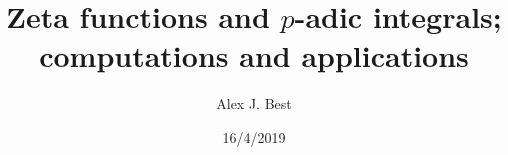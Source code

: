 
\beamertemplatenavigationsymbolsempty

\usepackage{amsmath, amssymb, amsfonts, tikz}
\usepackage[utf8]{inputenc}
\usepackage[T1]{fontenc}
\usepackage[english]{babel}
\usepackage{tabularx}
\usepackage{mathtools}
\usepackage{xmpmulti}


\usepackage{amsthm}
\theoremstyle{plain}
\newtheorem{theorem}{Theorem}[section]
\newtheorem{corollary}[theorem]{Corollary}
\newtheorem{lemma}[theorem]{Lemma}
\newtheorem{algorithm}[theorem]{Algorithm}
\newtheorem{proposition}[theorem]{Proposition}
\newtheorem{claim}[theorem]{Claim}
\newtheorem{fact}[theorem]{Fact}
\newtheorem{conjecture}[theorem]{Conjecture}
\theoremstyle{definition}
\newtheorem{definition}[theorem]{Definition}
\theoremstyle{definition}
\newtheorem{remark}[theorem]{Remark}
\newtheorem{observation}[theorem]{Observation}
\theoremstyle{definition}
\newtheorem{example}[theorem]{Example}
\newtheorem{question}[theorem]{Question}
\newcommand{\terminology}[1]{\textbf{#1}}

\newcommand{\NN}{\mathbf{N}}
\newcommand{\ZZ}{\mathbf{Z}}
\newcommand{\QQ}{\mathbf Q}
\newcommand{\CC}{\mathbf C}
\newcommand{\RR}{\mathbf R}
\newcommand{\FF}{\mathbf F}
\newcommand{\lt}{<}
\newcommand{\gt}{>}
\newcommand{\amp}{&}
\newcommand{\diff}{\mathop{}\!\mathrm{d}}
\newcommand{\ints}{\mathcal{O}}
\newcommand{\ideal}[1]{\mathfrak{#1}}
\usepackage{mathrsfs}\usepackage{cancel}
\newcommand{\Gal}[2]{\operatorname{Gal}(#1/#2)}
\newcommand{\absgal}[1]{\operatorname{Gal}(\overline{#1}/#1)}
\DeclareMathOperator{\USp}{USp}
\DeclareMathOperator{\Spec}{Spec}

\newcommand{\sheaf}[1]{\operatorname{\mathcal{#1}}}
\newcommand{\inv}{^{-1}}
\DeclareMathOperator{\norm}{Nm}
\DeclareMathOperator{\ord}{ord}
\DeclareMathOperator{\divisor}{div}
\DeclareMathOperator{\PP}{\mathbf{P}}
\DeclareMathOperator{\Hom}{Hom}
\DeclareMathOperator{\Mat}{Mat}
\DeclareMathOperator{\End}{End}

\newcommand{\lb}{[}
\newcommand{\rb}{]}

\author{Alex J. Best}
\date{16/4/2019}
\title{Zeta functions and $p$-adic integrals; computations and applications}




